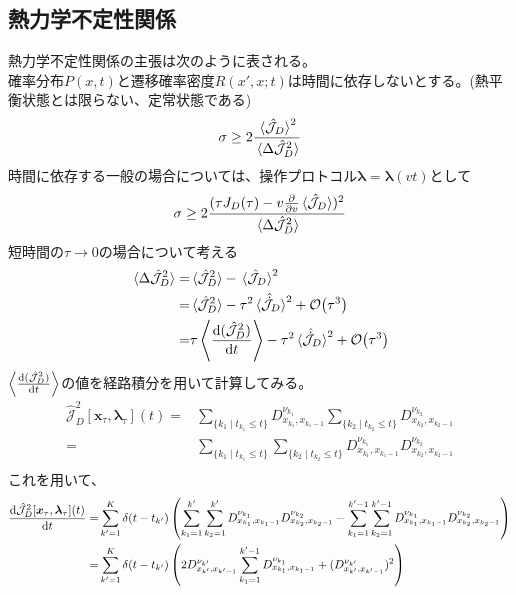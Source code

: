 \documentclass{ltjsarticle}
\begin{document}
\subsection{熱力学不定性関係}
熱力学不定性関係の主張は次のように表される。\\
確率分布$P(x,t)$と遷移確率密度$R(x',x;t)$は時間に依存しないとする。(熱平衡状態とは限らない、定常状態である)
\begin{align}
  \sigma\ge 2\frac{\ev*{\hat{\mathcal{J}}_D}^2}{\ev*{\Delta\hat{\mathcal{J}}_D^2}}
\end{align}
時間に依存する一般の場合については、操作プロトコル$\bm{\lambda}=\bm{\lambda}(vt)$として
\begin{align}
  \sigma\ge 2\frac{(\tau J_D(\tau)-v\pdv{v}\ev*{\hat{\mathcal{J}}_D})^2}{\ev*{\Delta\hat{\mathcal{J}}_D^2}}
\end{align}
短時間の$\tau\to 0$の場合について考える
\begin{align}
  \ev*{\Delta\hat{\mathcal{J}}_D^2}=&\ev*{\hat{\mathcal{J}}_D^2}-\ev*{\hat{\mathcal{J}}_D}^2\\
  =&\ev*{\hat{\mathcal{J}}_D^2}-\tau^2\ev*{\hat{\dot{\mathcal{J}}}_D}^2+\order{\tau^3}\\
  =&\tau\ev{\dv{(\hat{\mathcal{J}}_D^2)}{t}}-\tau^2\ev*{\hat{\dot{\mathcal{J}}}_D}^2+\order{\tau^3}\\
\end{align}
$\ev{\dv{(\hat{\mathcal{J}}_D^2)}{t}}$の値を経路積分を用いて計算してみる。\\
\begin{align}
  \hat{\mathcal{J}}_D^2[\bm{x}_\tau,\bm{\lambda}_\tau](t)=&\sum_{\lbrace k_1\mid t_{k_1}\le t\rbrace} D^{\nu_{k_1}}_{x_{k_1},x_{k_1-1}}\sum_{\lbrace k_2\mid t_{k_2}\le t\rbrace} D^{\nu_{k_2}}_{x_{k_2},x_{k_2-1}}\\
  =&\sum_{\lbrace k_1\mid t_{k_1}\le t\rbrace} \sum_{\lbrace k_2\mid t_{k_2}\le t\rbrace} D^{\nu_{k_1}}_{x_{k_1},x_{k_1-1}} D^{\nu_{k_2}}_{x_{k_2},x_{k_2-1}}\\
\end{align}
これを用いて、
\begin{align}
  \dv{\hat{\mathcal{J}}_D^2[\bm{x}_\tau,\bm{\lambda}_\tau](t)}{t}
  =&\sum_{k'=1}^{K}\delta(t-t_{k'})\left(\sum_{k_1=1}^{k'} \sum_{k_2=1}^{k'} D^{\nu_{k_1}}_{x_{k_1},x_{k_1-1}} D^{\nu_{k_2}}_{x_{k_2},x_{k_2-1}}-\sum_{k_1=1}^{k'-1} \sum_{k_2=1}^{k'-1} D^{\nu_{k_1}}_{x_{k_1},x_{k_1-1}} D^{\nu_{k_2}}_{x_{k_2},x_{k_2-1}}\right)\\
  =&\sum_{k'=1}^{K}\delta(t-t_{k'})\left(2D^{\nu_{k'}}_{x_{k'},x_{k'-1}}\sum_{k_1=1}^{k'-1}D^{\nu_{k_1}}_{x_{k_1},x_{k_1-1}}+(D^{\nu_{k'}}_{x_{k'},x_{k'-1}})^2\right)
\end{align}
\end{document}
